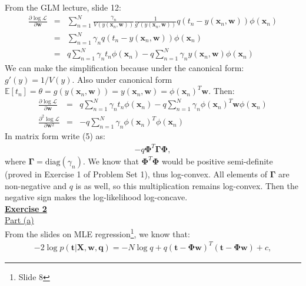 \documentclass[a4paper, 11pt]{article}
\begin{document}
From the GLM lecture, slide 12:
\begin{eqnarray}
\frac{\partial \log \mathcal{L}}{\partial \mathbf{w}} &=& \sum_{n=1}^{N} \frac{\gamma_n}{V(y(\mathbf{x}_n, \mathbf{w}))} \frac{1}{g'(y(\mathbf{x}_n, \mathbf{w}))} q(t_n - y(\mathbf{x}_n, \mathbf{w})) \phi(\mathbf{x}_n)  \nonumber \\
&=& \sum_{n=1}^{N} \gamma_n q(t_n - y(\mathbf{x}_n, \mathbf{w})) \phi(\mathbf{x}_n) \nonumber \\
&=& q \sum_{n=1}^{N} \gamma_n t_n \phi(\mathbf{x}_n) - q \sum_{n=1}^{N} \gamma_n y(\mathbf{x}_n, \mathbf{w}) \phi(\mathbf{x}_n)   \nonumber
\end{eqnarray}
We can make the simplification because under the canonical form: $g'(y) = 1/V(y)$. Also under canonical form $\mathbb{E}[t_n] = \theta = g(y(\mathbf{x}_n, \mathbf{w})) = y(\mathbf{x}_n, \mathbf{w}) = \phi(\mathbf{x}_n)^T \mathbf{w}$. Then:
\begin{eqnarray}
\frac{\partial \log \mathcal{L}}{\partial \mathbf{w}} &=& q \sum_{n=1}^{N} \gamma_n t_n \phi(\mathbf{x}_n) - q \sum_{n=1}^{N} \gamma_n \phi(\mathbf{x}_n)^T \mathbf{w} \phi(\mathbf{x}_n)  \nonumber \\
\frac{\partial^2 \log \mathcal{L}}{\partial \mathbf{w}^2} &=& -q \sum_{n=1}^{N} \gamma_n \phi(\mathbf{x}_n)^T \phi(\mathbf{x}_n)
\end{eqnarray}
In matrix form write (5) as:
\begin{eqnarray}
-q \mathbf{\Phi}^T \mathbf{\Gamma} \mathbf{\Phi}, \nonumber
\end{eqnarray}
where $\mathbf{\Gamma} = \text{diag}(\gamma_n)$. We know that $\mathbf{\Phi}^T \mathbf{\Phi}$ would be positive semi-definite (proved in Exercise 1 of Problem Set 1), thus log-convex. All elements of $\mathbf{\Gamma}$ are non-negative and $q$ is as well, so this multiplication remains log-convex. Then the negative sign makes the log-likelihood log-concave.\\
\newpage
\textbf{\underline{Exercise 2}}\\
\newline \underline{Part (a)}\\
\newline From the slides on MLE regression\footnote{Slide 8}, we know that:
\begin{eqnarray}
-2 \log p(\mathbf{t} | \mathbf{X}, \mathbf{w}, \mathbf{q}) = -N \log q + q (\mathbf{t} - \mathbf{\Phi w})^T (\mathbf{t} - \mathbf{\Phi w}) + c, \nonumber
\end{eqnarray}
\end{document}
